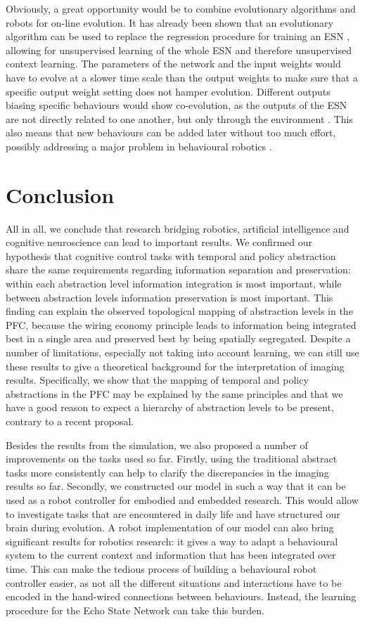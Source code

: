 \documentclass[10pt,a4paper]{report}
\begin{document}
Obviously, a great opportunity would be to combine evolutionary algorithms and robots for on-line evolution. It has already been shown that an evolutionary algorithm can be used to replace the regression procedure for training an ESN \cite{Hartland2009}, allowing for unsupervised learning of the whole ESN and therefore unsupervised context learning. The parameters of the network and the input weights would have to evolve at a slower time scale than the output weights to make sure that a specific output weight setting does not hamper evolution. Different outputs biasing specific behaviours would show co-evolution, as the outputs of the ESN are not directly related to one another, but only through the environment \citep{Nolfi1998}. This also means that new behaviours can be added later without too much effort, possibly addressing a major problem in behavioural robotics \citep{Arkin1998}.

\chapter{Conclusion}

All in all, we conclude that research bridging robotics, artificial intelligence and cognitive neuroscience can lead to important results. We confirmed our hypothesis that cognitive control tasks with temporal and policy abstraction share the same requirements regarding information separation and preservation: within each abstraction level information integration is most important, while between abstraction levels information preservation is most important. This finding can explain the observed topological mapping of abstraction levels in the PFC, because the wiring economy principle leads to information being integrated best in a single area and preserved best by being spatially segregated. Despite a number of limitations, especially not taking into account learning, we can still use these results to give a theoretical background for the interpretation of imaging results. Specifically, we show that the mapping of temporal and policy abstractions in the PFC may be explained by the same principles and that we have a good reason to expect a hierarchy of abstraction levels to be present, contrary to a recent proposal. 

Besides the results from the simulation, we also proposed a number of improvements on the tasks used so far. Firstly, using the traditional abstract tasks more consistently can help to clarify the discrepancies in the imaging results so far. Secondly, we constructed our model in such a way that it can be used as a robot controller for embodied and embedded research. This would allow to investigate tasks that are encountered in daily life and have structured our brain during evolution. A robot implementation of our model can also bring significant results for robotics research: it gives a way to adapt a behavioural system to the current context and information that has been integrated over time. This can make the tedious process of building a behavioural robot controller easier, as not all the different situations and interactions have to be encoded in the hand-wired connections between behaviours. Instead, the learning procedure for the Echo State Network can take this burden.
\end{document}
